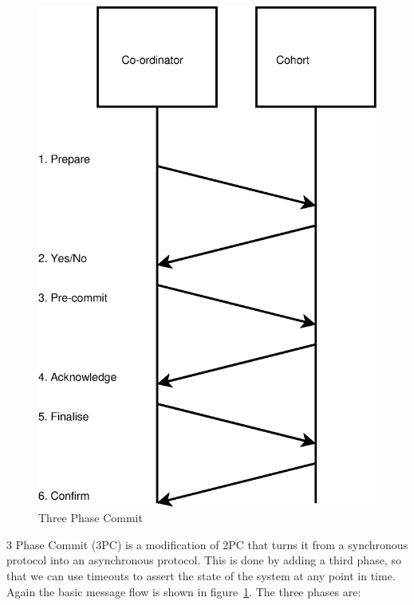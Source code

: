 \documentclass[12pt,twoside,notitlepage]{report}
\begin{document}
\begin{figure}[h!]
\centering
\includegraphics[scale=0.5]{figs/three-pc.eps}
\caption{\label{fig:three-pc}Three Phase Commit}
\end{figure}

3 Phase Commit (3PC) is a modification of 2PC that turns it from a synchronous protocol into an
asynchronous protocol. This is done by adding a third phase, so that we can use timeouts to assert
the state of the system at any point in time. Again the basic message flow is shown in
figure~\ref{fig:three-pc}. The three phases are:
\end{document}
